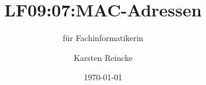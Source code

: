 \documentclass[]{beamer}
\title{LF09:07:MAC-Adressen}
\subtitle{für Fachinformatikerin}
\institute[GS-LDK]{Gewerbliche Schulen Dillenburg}
\author{Karsten Reincke}
\date{\today}
\def\cfgGl{../../../cfg.gl/}
\begin{document}

\begin{frame}
  \titlepage

  
\end{frame}






\logo{}
\newpage



%
\end{document}
